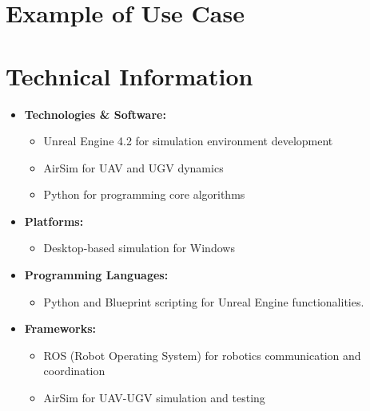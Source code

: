 \documentclass{article}
\begin{document}
\section{Example of Use Case}



\section{Technical Information}
\begin{itemize}
    \item \textbf{Technologies \& Software:} 
    \begin{itemize}
        \item Unreal Engine 4.2 for simulation environment development
        \item AirSim for UAV and UGV dynamics
        \item Python for programming core algorithms 
    \end{itemize}
    \item \textbf{Platforms:} 
    \begin{itemize}
        \item Desktop-based simulation for Windows
    \end{itemize}
    \item \textbf{Programming Languages:}
    \begin{itemize}
        \item Python and Blueprint scripting for Unreal Engine functionalities.
    \end{itemize}
    \item \textbf{Frameworks:}
    \begin{itemize}
        \item ROS (Robot Operating System) for robotics communication and coordination
        \item AirSim for UAV-UGV simulation and testing
    \end{itemize}

\end{itemize}

\end{document}
